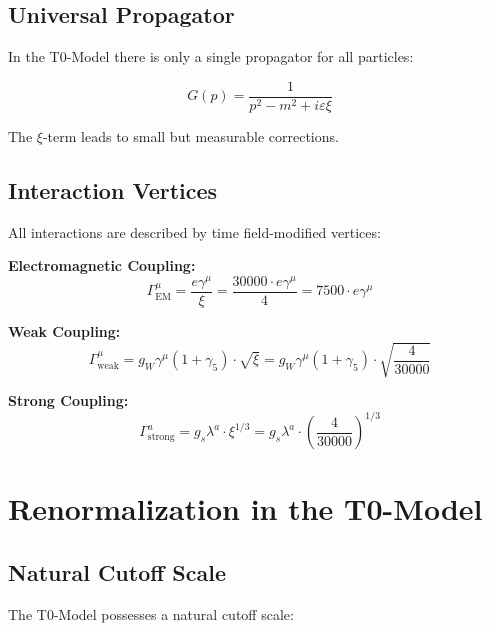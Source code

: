 \documentclass[12pt,a4paper]{report}
\newcommand{\xipar}{\xi}      %
\begin{document}
	\subsection{Universal Propagator}\label{subsec:universal_propagator}
	
	In the T0-Model there is only a single propagator for all particles:
	
	\begin{equation}\label{eq:universal_propagator}
		G(p) = \frac{1}{p^2 - m^2 + i\varepsilon \xipar}
	\end{equation}
	
	The $\xipar$-term leads to small but measurable corrections.
	
	\subsection{Interaction Vertices}\label{subsec:interaction_vertices}
	
	All interactions are described by time field-modified vertices:
	
	\textbf{Electromagnetic Coupling:}
	\begin{equation}
		\Gamma_{\text{EM}}^\mu = \frac{e \gamma^\mu}{\xipar} = \frac{30000 \cdot e \gamma^\mu}{4} = 7500 \cdot e \gamma^\mu
	\end{equation}
	
	\textbf{Weak Coupling:}
	\begin{equation}
		\Gamma_{\text{weak}}^\mu = g_W \gamma^\mu (1 + \gamma_5) \cdot \sqrt{\xipar} = g_W \gamma^\mu (1 + \gamma_5) \cdot \sqrt{\frac{4}{30000}}
	\end{equation}
	
	\textbf{Strong Coupling:}
	\begin{equation}
		\Gamma_{\text{strong}}^a = g_s \lambda^a \cdot \xipar^{1/3} = g_s \lambda^a \cdot \left(\frac{4}{30000}\right)^{1/3}
	\end{equation}
	
	\section{Renormalization in the T0-Model}\label{sec:renormalization}
	
	\subsection{Natural Cutoff Scale}\label{subsec:natural_cutoff}
	
	The T0-Model possesses a natural cutoff scale:
	
\end{document}
